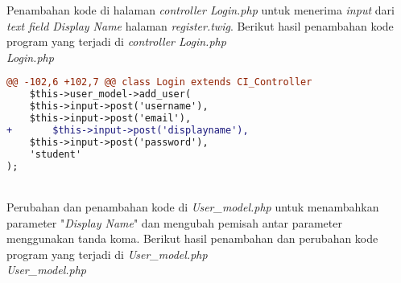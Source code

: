Penambahan kode di halaman \textit{controller Login.php} untuk menerima \textit{input} dari \textit{text field Display Name} halaman \textit{register.twig}. Berikut hasil penambahan kode program yang terjadi di \textit{controller Login.php}\\
\textit{Login.php}
\begin{lstlisting}[language=diff, basicstyle=\ttfamily, frame=single,
columns=fullflexible, keepspaces=true, breaklines=true]
@@ -102,6 +102,7 @@ class Login extends CI_Controller
	$this->user_model->add_user(
	$this->input->post('username'),
	$this->input->post('email'),
+   	$this->input->post('displayname'),
	$this->input->post('password'),
	'student'
);
\end{lstlisting}
~\\
Perubahan dan penambahan kode di \textit{User\_model.php} untuk menambahkan parameter "\textit{Display Name}" dan mengubah pemisah antar parameter menggunakan tanda koma. Berikut hasil penambahan dan perubahan kode program yang terjadi di \textit{User\_model.php}\\
\textit{User\_model.php}
